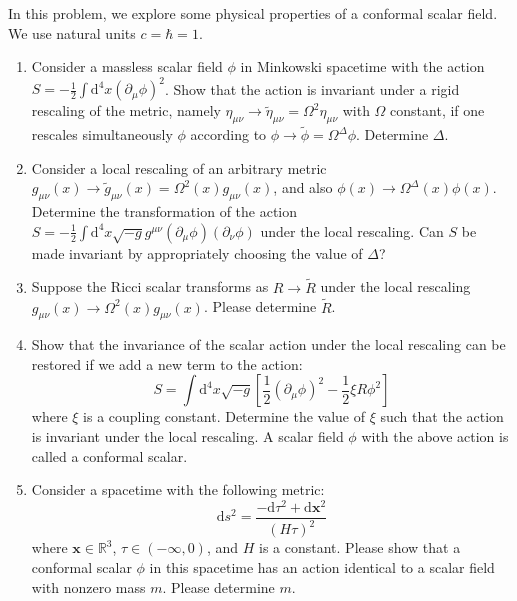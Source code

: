 \begin{exercise}
\label{physics:2025:6}
In this problem, we explore some physical properties of a conformal scalar field. We use natural units $c = \hbar = 1$.

\begin{enumerate}
    \item Consider a massless scalar field $\phi$ in Minkowski spacetime with the action $S = - \frac{1}{2} \int \mathrm{d}^4 x (\partial_\mu \phi)^2$. Show that the action is invariant under a rigid rescaling of the metric, namely $\eta_{\mu\nu} \to \tilde{\eta}_{\mu\nu} = \Omega^2 \eta_{\mu\nu}$ with $\Omega$ constant, if one rescales simultaneously $\phi$ according to $\phi \to \tilde{\phi} = \Omega^\Delta \phi$. Determine $\Delta$.
    \item Consider a local rescaling of an arbitrary metric $g_{\mu\nu}(x) \to \tilde{g}_{\mu\nu}(x) = \Omega^2(x) g_{\mu\nu}(x)$, and also $\phi(x) \to \Omega^\Delta(x) \phi(x)$. Determine the transformation of the action $S = - \frac{1}{2} \int \mathrm{d}^4 x \sqrt{-g} g^{\mu\nu} (\partial_\mu \phi) (\partial_\nu \phi)$ under the local rescaling. Can $S$ be made invariant by appropriately choosing the value of $\Delta$?
    \item Suppose the Ricci scalar transforms as $R \to \tilde{R}$ under the local rescaling $g_{\mu\nu}(x) \to \Omega^2(x) g_{\mu\nu}(x)$. Please determine $\tilde{R}$.
    \item Show that the invariance of the scalar action under the local rescaling can be restored if we add a new term to the action:
    \begin{equation}
        S = \int \mathrm{d}^4 x \sqrt{-g} \left[ \frac{1}{2} (\partial_\mu \phi)^2 - \frac{1}{2} \xi R \phi^2 \right] \tag{9}
    \end{equation}
    where $\xi$ is a coupling constant. Determine the value of $\xi$ such that the action is invariant under the local rescaling. A scalar field $\phi$ with the above action is called a conformal scalar.
    \item Consider a spacetime with the following metric:
    \begin{equation}
        \mathrm{d} s^2 = \frac{-\mathrm{d} \tau^2 + \mathrm{d} \mathbf{x}^2}{(H \tau)^2} \tag{10}
    \end{equation}
    where $\mathbf{x} \in \mathbb{R}^3$, $\tau \in (-\infty, 0)$, and $H$ is a constant. Please show that a conformal scalar $\phi$ in this spacetime has an action identical to a scalar field with nonzero mass $m$. Please determine $m$.
\end{enumerate}
\end{exercise}

